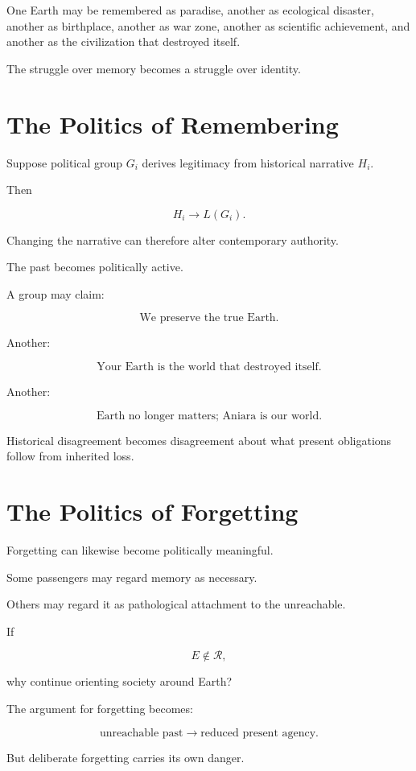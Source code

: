 \documentclass[11pt,oneside]{book}
\theoremstyle{definition}
\theoremstyle{remark}
\newcommand{\R}{\mathcal{R}}
\begin{document}
One Earth may be remembered as paradise, another as ecological disaster, another as birthplace, another as war zone, another as scientific achievement, and another as the civilization that destroyed itself.

The struggle over memory becomes a struggle over identity.

\section{The Politics of Remembering}

Suppose political group \(G_i\) derives legitimacy from historical narrative \(H_i\).

Then

\[
H_i
\rightarrow
L(G_i).
\]

Changing the narrative can therefore alter contemporary authority.

The past becomes politically active.

A group may claim:

\[
\text{We preserve the true Earth.}
\]

Another:

\[
\text{Your Earth is the world that destroyed itself.}
\]

Another:

\[
\text{Earth no longer matters; Aniara is our world.}
\]

Historical disagreement becomes disagreement about what present obligations follow from inherited loss.

\section{The Politics of Forgetting}

Forgetting can likewise become politically meaningful.

Some passengers may regard memory as necessary.

Others may regard it as pathological attachment to the unreachable.

If

\[
E\notin\R,
\]

why continue orienting society around Earth?

The argument for forgetting becomes:

\[
\text{unreachable past}
\rightarrow
\text{reduced present agency}.
\]

But deliberate forgetting carries its own danger.
\end{document}
